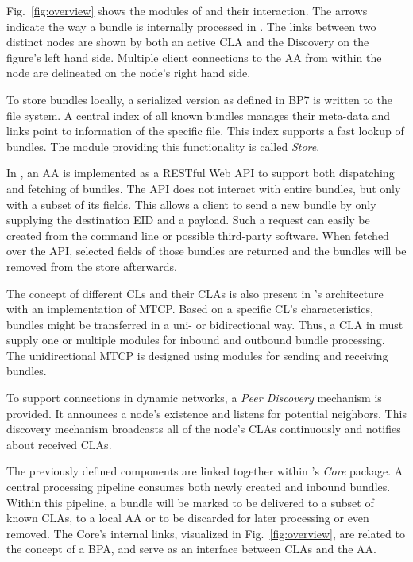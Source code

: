 Fig.~\ref{fig:overview} shows the modules of \dtn and their interaction.
The arrows indicate the way a bundle is internally processed in \dtn. 
The links between two distinct \dtn nodes are shown by both an active CLA and the Discovery on the figure's left hand side. 
Multiple client connections to the AA from within the node are delineated on the node's right hand side.

To store bundles locally, a serialized version as defined in BP7 is written to the file system. 
A central index of all known bundles manages their meta-data and links point to information of the specific file.
This index supports a fast lookup of bundles. The module providing this functionality is called \textit{Store}.

In \dtn, an AA is implemented as a RESTful Web API to support both dispatching and fetching of bundles. 
The API does not interact with entire bundles, but only with a subset of its fields.
This allows a client to send a new bundle by only supplying the destination EID and a payload. 
Such a request can easily be created from the command line or possible third-party software.
When fetched over the API, selected fields of those bundles are returned and the bundles will be removed from the store afterwards.

The concept of different CLs and their CLAs is also present in \dtn's architecture with an implementation of MTCP.
Based on a specific CL's characteristics, bundles might be transferred in a uni- or bidirectional way. Thus, a CLA in \dtn must supply one or multiple modules for inbound and outbound bundle processing.
The unidirectional MTCP is designed using modules for sending and receiving bundles.

To support connections in dynamic networks, a \textit{Peer Discovery} mechanism is provided. It announces a node's existence and listens for potential neighbors.
This discovery mechanism broadcasts all of the node's CLAs continuously and notifies about received CLAs.

The previously defined components are linked together within \dtn's \textit{Core} package. 
A central processing pipeline consumes both newly created and inbound bundles. 
Within this pipeline, a bundle will be marked to be delivered to a subset of known CLAs, to a local AA or to be discarded for later processing or even removed.
The Core's internal links, visualized in Fig.~\ref{fig:overview}, are related to the concept of a BPA, and serve as an interface between CLAs and the AA.

